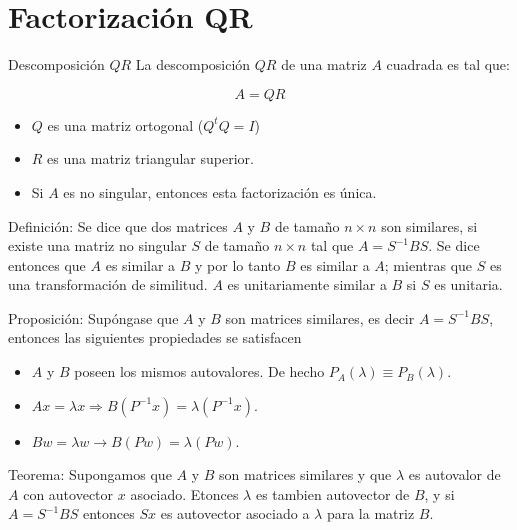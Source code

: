 \documentclass[11pt]{beamer}
\begin{document}
\section{Factorizaci\'on QR}
\begin{frame}{Descomposici\'on $QR$}
La descomposici\'on $QR$ de una matriz $A$ cuadrada es tal que:
\begin{block}{}
    $$
    A = QR
    $$
\end{block}
\begin{itemize}
   \item<2-> $Q$ es una matriz ortogonal ($Q^tQ=I$)
   \item<3-> $R$ es una matriz triangular superior.
   \item<4-> Si $A$ es no singular, entonces  esta factorizaci\'on es \'unica.
\end{itemize}
\end{frame}
\begin{frame}
\begin{block}{Definici\'on:}
   Se dice que dos matrices $A$ y $B$ de tama\~no $n \times n$ son similares, si existe una matriz 
no singular $S$ de tama\~no $n \times n$ tal que $A = S^{-1}BS$. Se dice entonces que $A$  es 
similar a $B$ y por lo tanto $B$ es similar a $A$; mientras que $S$ es una transformaci\'on de 
similitud. $A$ es unitariamente similar a $B$ si $S$ es unitaria.
\end{block}
\end{frame}
\begin{frame}
 \begin{block}{Proposici\'on:}
 Sup\'ongase que $A$ y $B$  son matrices similares, es decir $A=S^{-1}BS$, entonces las siguientes
 propiedades se satisfacen
 \begin{itemize}
    \item<2-> $A$ y $B$ poseen los mismos autovalores. De hecho $P_A(\lambda) \equiv P_B(\lambda)$.
\item<3-> $Ax = \lambda x \Rightarrow B(P^{-1}x) = \lambda(P^{-1}x)$.
\item<4-> $Bw = \lambda w \to B(Pw) = \lambda(Pw)$.
 \end{itemize}
 \end{block}
\end{frame}
\begin{frame}
\begin{block}{Teorema:}
Supongamos que $A$ y $B$ son matrices similares y que $\lambda$ es autovalor de $A$ con autovector 
$x$ asociado. Etonces $\lambda$ es tambien autovector de $B$, y si $A=S^{-1}BS$ entonces $Sx$ es 
autovector asociado a $\lambda$  para la matriz $B$.
\end{block}
\end{frame}
\end{document}
